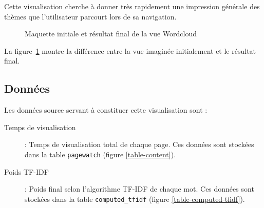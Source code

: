 		Cette visualisation cherche à donner très rapidement une impression générale des thèmes que l'utilisateur parcourt lors de sa navigation.

		\begin{figure}[!h]
			\centering
			\caption{Maquette initiale et résultat final de la vue Wordcloud}
			\label{wordcloud_images}
		\end{figure}

		La figure~\ref{wordcloud_images} montre la différence entre la vue imaginée initialement et le résultat final.

	\subsection{Données}

		Les données source servant à constituer cette visualisation sont :
		\begin{description}
			\item[Temps de visualisation] : Temps de visualisation total de chaque page. Ces données sont stockées dans la table \texttt{pagewatch} (figure \ref{table-content}).
			\item[Poids TF-IDF] : Poids final selon l'algorithme TF-IDF de chaque mot. Ces données sont stockées dans la table \texttt{computed\_tfidf} (figure \ref{table-computed-tfidf}).
		\end{description}

